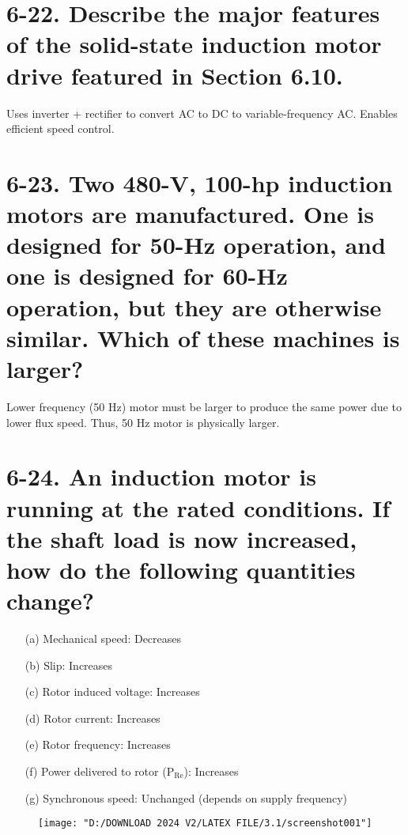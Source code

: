 \documentclass[a4paper,12pt]{article}
\begin{document}
\section*{6-22. Describe the major features of the solid-state induction motor drive featured in Section 6.10.}
Uses inverter + rectifier to convert AC to DC to variable-frequency AC. Enables efficient speed control.

\section*{6-23. Two 480-V, 100-hp induction motors are manufactured. One is designed for 50-Hz operation, and one is designed for 60-Hz operation, but they are otherwise similar. Which of these machines is larger?}
Lower frequency (50 Hz) motor must be larger to produce the same power due to lower flux speed. Thus, 50 Hz motor is physically larger.

\section*{6-24. An induction motor is running at the rated conditions. If the shaft load is now increased, how do the following quantities change?}
\begin{enumerate}
	\item[(a)] Mechanical speed: Decreases
	\item[(b)] Slip: Increases
	\item[(c)] Rotor induced voltage: Increases
	\item[(d)] Rotor current: Increases
	\item[(e)] Rotor frequency: Increases
	\item[(f)] Power delivered to rotor (P$_{\text{Re}}$): Increases
	\item[(g)] Synchronous speed: Unchanged (depends on supply frequency)
\end{enumerate}

\newpage
	\begin{figure}[H]
		\centering
	
		\label{fig:screenshot001}
		
		\texttt{[image: "D:/DOWNLOAD 2024 V2/LATEX FILE/3.1/screenshot001"]}
			
	\end{figure}
\end{document}
